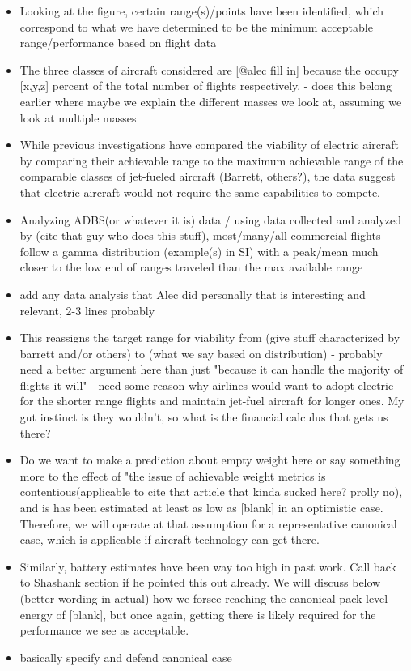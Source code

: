 \begin{itemize}
    \item Looking at the figure, certain range(s)/points have been identified, which correspond to what we have determined to be the minimum acceptable range/performance based on flight data
    
    \item The three classes of aircraft considered are [@alec fill in] because the occupy [x,y,z] percent of the total number of flights respectively.
        \subitem - does this belong earlier where maybe we explain the different masses we look at, assuming we look at multiple masses
        
    \item While previous investigations have compared the viability of electric aircraft by comparing their achievable range to the maximum achievable range of the comparable classes of jet-fueled aircraft (Barrett, others?), the data suggest that electric aircraft would not require the same capabilities to compete.
    
    \item Analyzing ADBS(or whatever it is) data / using data collected and analyzed by (cite that guy who does this stuff), most/many/all commercial flights follow a gamma distribution (example(s) in SI) with a peak/mean much closer to the low end of ranges traveled than the max available range
    \item add any data analysis that Alec did personally that is interesting and relevant, 2-3 lines probably
    \item This reassigns the target range for viability from (give stuff characterized by barrett and/or others) to (what we say based on distribution)
        \subitem - probably need a better argument here than just "because it can handle the majority of flights it will"
        \subitem - need some reason why airlines would want to adopt electric for the shorter range flights and maintain jet-fuel aircraft for longer ones. My gut instinct is they wouldn't, so what is the financial calculus that gets us there? 
    
    \item Do we want to make a prediction about empty weight here or say something more to the effect of "the issue of achievable weight metrics is contentious(applicable to cite that article that kinda sucked here? prolly no), and is has been estimated at least as low as [blank] in an optimistic case. Therefore, we will operate at that assumption for a representative canonical case, which is applicable if aircraft technology can get there.
    
    \item Similarly, battery estimates have been way too high in past work. Call back to Shashank section if he pointed this out already. We will discuss below (better wording in actual) how we forsee reaching the canonical pack-level energy of [blank], but once again, getting there is likely required for the performance we see as acceptable.
    \item basically specify and defend canonical case
\end{itemize}  
